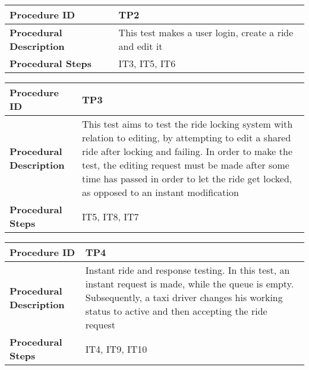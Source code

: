 \vspace{2em}

\noindent\begin{tabular}{l p{}}
    \hline
    \textbf{Procedure ID} & \textbf{TP2}\\
    \hline
    \textbf{Procedural Description} & This test makes a user login, create a ride and edit it\\
    \hline
    \textbf{Procedural Steps} & IT3, IT5, IT6\\
	\hline
\end{tabular}

\vspace{2em}

\noindent\begin{tabular}{l p{}}
    \hline
    \textbf{Procedure ID} & \textbf{TP3}\\
    \hline
    \textbf{Procedural Description} & This test aims to test the ride locking system with relation to editing, by attempting to edit a shared ride after locking and failing.
		In order to make the test, the editing request must be made after some time has passed in order to let the ride get locked, as opposed to an instant modification\\
    \hline
    \textbf{Procedural Steps} & IT5, IT8, IT7\\
	\hline
\end{tabular}

\vspace{2em}

\noindent\begin{tabular}{l p{}}
    \hline
    \textbf{Procedure ID} & \textbf{TP4}\\
    \hline
    \textbf{Procedural Description} & Instant ride and response testing. In this test, an instant request is made, while the queue is empty. Subsequently, a taxi driver changes his
		working status to active and then accepting the ride request\\
    \hline
    \textbf{Procedural Steps} & IT4, IT9, IT10\\
	\hline
\end{tabular}
